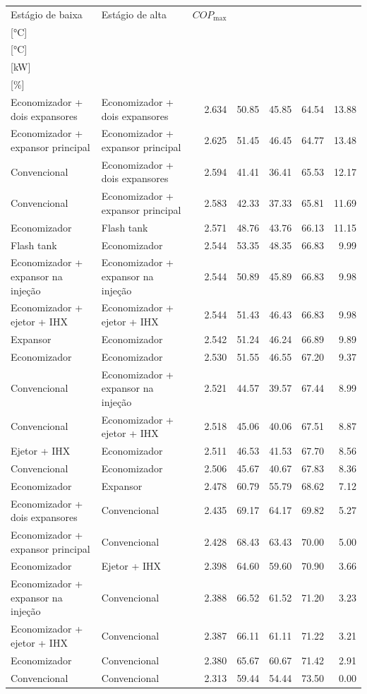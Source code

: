 {\small\setlength{\tabcolsep}{4pt}\renewcommand{\arraystretch}{1.12}
\begin{tabular}{llrrrrr}
\toprule
Estágio de baixa & Estágio de alta & $COP_{\max}$ & \shortstack{$T_{\mathrm{cond,l}}^*$\\{[°C]}} & \shortstack{$T_{\mathrm{evap,h}}^*$\\{[°C]}} & \shortstack{$\dot W_{\mathrm{liq}}$\\{[kW]}} & \shortstack{$\Delta COP_{\mathrm{opt}}$\\{[\%]}} \\
\midrule
Economizador + dois expansores & Economizador + dois expansores & 2.634 & 50.85 & 45.85 & 64.54 & 13.88 \\
Economizador + expansor principal & Economizador + expansor principal & 2.625 & 51.45 & 46.45 & 64.77 & 13.48 \\
Convencional & Economizador + dois expansores & 2.594 & 41.41 & 36.41 & 65.53 & 12.17 \\
Convencional & Economizador + expansor principal & 2.583 & 42.33 & 37.33 & 65.81 & 11.69 \\
Economizador & Flash tank & 2.571 & 48.76 & 43.76 & 66.13 & 11.15 \\
Flash tank & Economizador & 2.544 & 53.35 & 48.35 & 66.83 & 9.99 \\
Economizador + expansor na injeção & Economizador + expansor na injeção & 2.544 & 50.89 & 45.89 & 66.83 & 9.98 \\
Economizador + ejetor + IHX & Economizador + ejetor + IHX & 2.544 & 51.43 & 46.43 & 66.83 & 9.98 \\
Expansor & Economizador & 2.542 & 51.24 & 46.24 & 66.89 & 9.89 \\
Economizador & Economizador & 2.530 & 51.55 & 46.55 & 67.20 & 9.37 \\
Convencional & Economizador + expansor na injeção & 2.521 & 44.57 & 39.57 & 67.44 & 8.99 \\
Convencional & Economizador + ejetor + IHX & 2.518 & 45.06 & 40.06 & 67.51 & 8.87 \\
Ejetor + IHX & Economizador & 2.511 & 46.53 & 41.53 & 67.70 & 8.56 \\
Convencional & Economizador & 2.506 & 45.67 & 40.67 & 67.83 & 8.36 \\
Economizador & Expansor & 2.478 & 60.79 & 55.79 & 68.62 & 7.12 \\
Economizador + dois expansores & Convencional & 2.435 & 69.17 & 64.17 & 69.82 & 5.27 \\
Economizador + expansor principal & Convencional & 2.428 & 68.43 & 63.43 & 70.00 & 5.00 \\
Economizador & Ejetor + IHX & 2.398 & 64.60 & 59.60 & 70.90 & 3.66 \\
Economizador + expansor na injeção & Convencional & 2.388 & 66.52 & 61.52 & 71.20 & 3.23 \\
Economizador + ejetor + IHX & Convencional & 2.387 & 66.11 & 61.11 & 71.22 & 3.21 \\
Economizador & Convencional & 2.380 & 65.67 & 60.67 & 71.42 & 2.91 \\
Convencional & Convencional & 2.313 & 59.44 & 54.44 & 73.50 & 0.00 \\
\bottomrule
\end{tabular}
}
